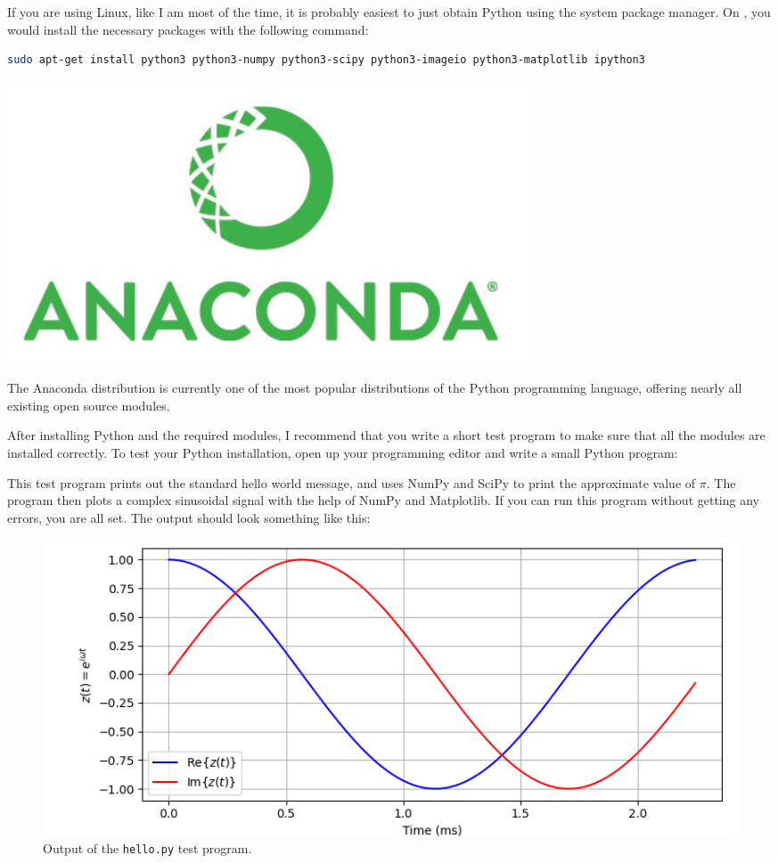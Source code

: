 If you are using Linux, like I am most of the time, it is
probably easiest to just obtain Python using the system package
manager. On , you would install the necessary packages with the following command:
\begin{lstlisting}[language=sh,caption=Installing Python on Ubuntu Linux,label=lst:linuxinstall]
sudo apt-get install python3 python3-numpy python3-scipy python3-imageio python3-matplotlib ipython3
\end{lstlisting}

\begin{marginfigure}[3cm]
  \includegraphics[width=0.68\textwidth]{ch02/figures/analogo.jpg}
  \caption{The Anaconda distribution is currently one of the most
    popular distributions of the Python programming language, offering
    nearly all existing open source modules.}
\end{marginfigure}

After installing Python and the required modules, I recommend that you
write a short test program to make sure that all the modules are
installed correctly. To test your Python installation, open up your
programming editor and write a small Python program:

This test program prints out the standard hello world message, and
uses NumPy and SciPy to print the approximate value of $\pi$. The program then
plots a complex sinusoidal signal with the help of NumPy and
Matplotlib.  If you can run this program without getting any errors,
you are all set. The output should look something like this:

\begin{figure}
  \includegraphics[width=\textwidth]{ch02/figures/testscreen1.png}
  \caption{Output of the \texttt{hello.py} test program.}
\end{figure}

